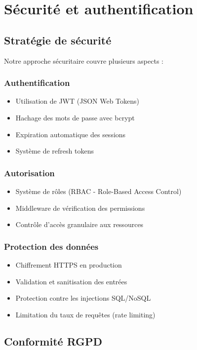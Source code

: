 \section{Sécurité et authentification}

\subsection{Stratégie de sécurité}

Notre approche sécuritaire couvre plusieurs aspects :

\subsubsection{Authentification}
\begin{itemize}
    \item Utilisation de JWT (JSON Web Tokens)
    \item Hachage des mots de passe avec bcrypt
    \item Expiration automatique des sessions
    \item Système de refresh tokens
\end{itemize}

\subsubsection{Autorisation}
\begin{itemize}
    \item Système de rôles (RBAC - Role-Based Access Control)
    \item Middleware de vérification des permissions
    \item Contrôle d'accès granulaire aux ressources
\end{itemize}

\subsubsection{Protection des données}
\begin{itemize}
    \item Chiffrement HTTPS en production
    \item Validation et sanitisation des entrées
    \item Protection contre les injections SQL/NoSQL
    \item Limitation du taux de requêtes (rate limiting)
\end{itemize}

\subsection{Conformité RGPD}

